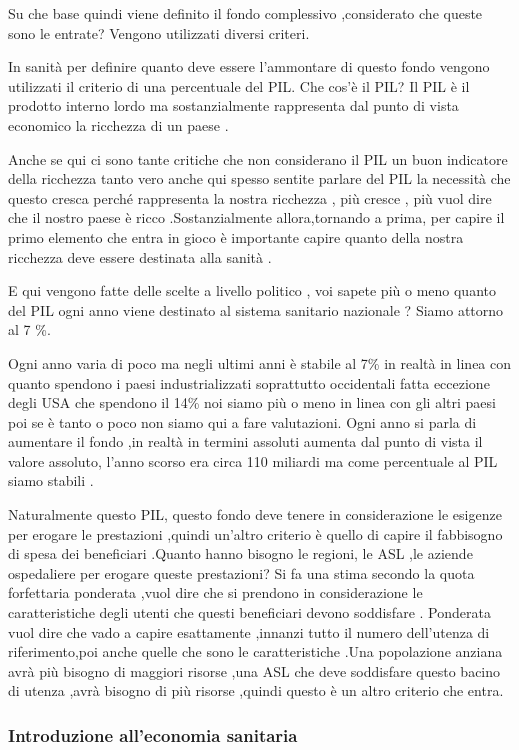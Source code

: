 Su che base quindi viene definito il fondo complessivo ,considerato che
queste sono le entrate? Vengono utilizzati diversi criteri.

In sanità per definire quanto deve essere l'ammontare di questo fondo
vengono utilizzati il criterio di una percentuale del PIL. Che cos'è il
PIL? Il PIL è il prodotto interno lordo ma sostanzialmente rappresenta
dal punto di vista economico la ricchezza di un paese .

Anche se qui ci sono tante critiche che non considerano il PIL un buon
indicatore della ricchezza tanto vero anche qui spesso sentite parlare
del PIL la necessità che questo cresca perché rappresenta la nostra
ricchezza , più cresce , più vuol dire che il nostro paese è ricco
.Sostanzialmente allora,tornando a prima, per capire il primo elemento
che entra in gioco è importante capire quanto della nostra ricchezza
deve essere destinata alla sanità .

E qui vengono fatte delle scelte a livello politico , voi sapete più o
meno quanto del PIL ogni anno viene destinato al sistema sanitario
nazionale ? Siamo attorno al 7 \%.

Ogni anno varia di poco ma negli ultimi anni è stabile al 7\% in realtà
in linea con quanto spendono i paesi industrializzati soprattutto
occidentali fatta eccezione degli USA che spendono il 14\% noi siamo più
o meno in linea con gli altri paesi poi se è tanto o poco non siamo qui
a fare valutazioni. Ogni anno si parla di aumentare il fondo ,in realtà
in termini assoluti aumenta dal punto di vista il valore assoluto,
l'anno scorso era circa 110 miliardi ma come percentuale al PIL siamo
stabili .

Naturalmente questo PIL, questo fondo deve tenere in considerazione le
esigenze per erogare le prestazioni ,quindi un'altro criterio è quello
di capire il fabbisogno di spesa dei beneficiari .Quanto hanno bisogno
le regioni, le ASL ,le aziende ospedaliere per erogare queste
prestazioni? Si fa una stima secondo la quota forfettaria ponderata
,vuol dire che si prendono in considerazione le caratteristiche degli
utenti che questi beneficiari devono soddisfare . Ponderata vuol dire
che vado a capire esattamente ,innanzi tutto il numero dell'utenza di
riferimento,poi anche quelle che sono le caratteristiche .Una
popolazione anziana avrà più bisogno di maggiori risorse ,una ASL che
deve soddisfare questo bacino di utenza ,avrà bisogno di più risorse
,quindi questo è un altro criterio che entra.

\subsubsection{Introduzione all'economia sanitaria}

